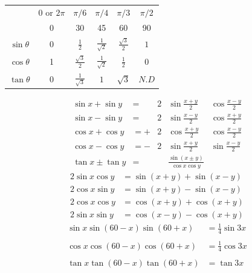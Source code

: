 \documentclass[11pt,a4paper,landscape,fleqn]{article}
\begin{document}
\begin{multicols*}{3}
\begin{align*}
\end{align*}
\vfill\null
\columnbreak
{\bfseries {}}\\
\begin{center}
\begin{tabular}{||c|| c c c c c||}
\hline
&0 or $2\pi$ &$\pi/6$ &$\pi/4$ &$\pi/3$ &$\pi/2$\\ [1ex]
& 0 & 30 & 45 & 60 & 90\\
\hline \hline
$\sin\theta$ & 0 & $\frac{1}{2}$ & $\frac{1}{\sqrt2}$& $\frac{\sqrt3}{2}$& $1$\\ 
$\cos\theta$ & 1 & $\frac{\sqrt3}{2}$ & $\frac{1}{\sqrt2}$& $\frac{1}{2}$& $0$\\ 
$\tan\theta$ & 0 & $\frac{1}{\sqrt3}$ & $1$& $\sqrt3$& $N.D$\\
\hline
\end{tabular}
\end{center}
{\bfseries {}}
\begin{align*}
\sin x + \sin y &=&2 & \sin \frac{x+y}{2} &\cos\frac{x-y}{2}\\
\sin x - \sin y &=&2  & \sin \frac{x-y}{2} &\cos \frac{x+y}{2}\\
\cos x + \cos y &=+ &2 & \cos \frac{x+y}{2} &\cos \frac{x-y}{2}\\
\cos x - \cos y &= -&2 & \sin \frac{x+y}{2} &\sin \frac{x-y}{2}\\
\tan x \pm \tan y &=&& \frac{\sin(x\pm y)}{\cos x \cos y}
\end{align*}
{\bfseries {}}
\begin{align*}
2\sin x \cos y &= \sin(x+y)+\sin(x-y)\\
2\cos x \sin y &= \sin(x+y) - \sin(x-y)\\
2\cos x \cos y &= \cos(x+y) + \cos(x+y)\\
2\sin x \sin y &=  \cos(x-y) - \cos(x+y) 
\end{align*}
{\bfseries {}}
\begin{align*}
\sin x \sin (60-x) \sin (60+x) &= \frac{1}{4}\sin 3x\\ \\
\cos x \cos(60-x) \cos(60+x)&= \frac{1}{4}\cos 3x\\ \\
\tan x \tan(60-x) \tan(60+x)&= \tan 3x
\end{align*}

\end{multicols*}
\end{document}
